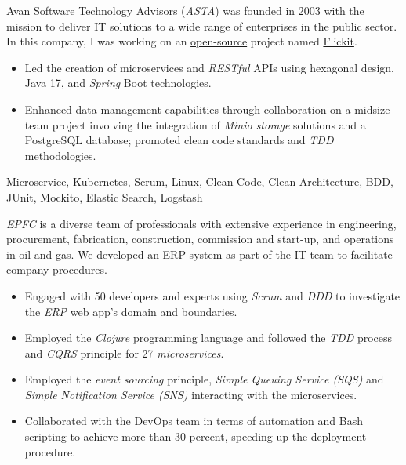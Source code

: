 \vspace*{-10pt}
\begin{experiences}
{
  Avan Software Technology Advisors (\emph{ASTA}) was founded in 2003 with the mission to deliver IT solutions to a wide range of enterprises in the public sector. In this company, I was working on an \href{https://github.com/flickit-platform/flickit-assessment}{open-source} project named \href{https://flickit.org/}{Flickit}.
  \begin{itemize}
    \item Led the creation of microservices and \emph{RESTful} APIs using hexagonal design, Java 17, and \emph{Spring} Boot technologies.
    \item Enhanced data management capabilities through collaboration on a midsize team project involving the integration of \emph{Minio storage} solutions and a PostgreSQL database; promoted clean code standards and \emph{TDD} methodologies. \end{itemize}}
  {Microservice, Kubernetes, Scrum, Linux, Clean Code, Clean Architecture, BDD, JUnit, Mockito, Elastic Search, Logstash} 
 \emptySeparator
 {
   \emph{EPFC} is a diverse team of professionals with extensive experience in engineering, procurement, fabrication, construction, commission and start-up, and operations in oil and gas. We developed an ERP system as part of the IT team to facilitate company procedures.
   \begin{itemize}
   \item Engaged with 50 developers and experts using \emph{Scrum} and \emph{DDD} to investigate the \textit{ERP} web app's domain and boundaries.
   \item Employed the \emph{Clojure} programming language and followed the \emph{TDD} process and \textit{CQRS} principle for 27 \emph{microservices}.
   \item Employed the \textit{event sourcing} principle, \textit{Simple Queuing Service (SQS)} and \textit{Simple Notification Service (SNS)} interacting with the microservices.
   \item Collaborated with the DevOps team in terms of automation and Bash scripting to achieve more than 30 percent, speeding up the deployment procedure.

\end{itemize}}
\end{experiences}
